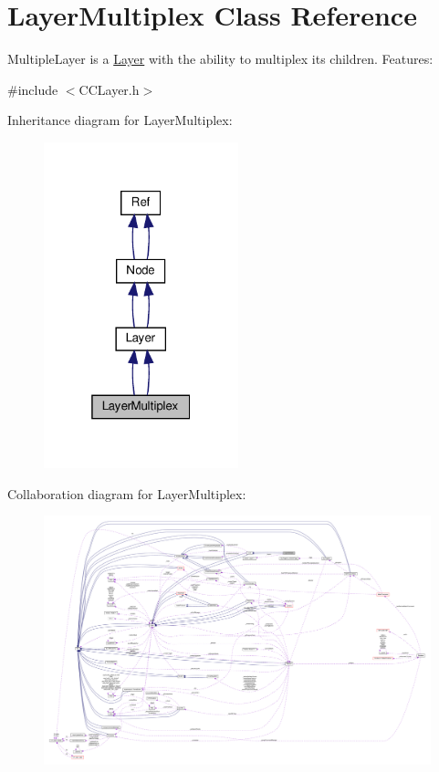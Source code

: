 \hypertarget{classLayerMultiplex}{}\section{Layer\+Multiplex Class Reference}
\label{classLayerMultiplex}


Multiple\+Layer is a \hyperlink{classLayer}{Layer} with the ability to multiplex it\textquotesingle{}s children. Features\+:  




{\ttfamily \#include $<$C\+C\+Layer.\+h$>$}



Inheritance diagram for Layer\+Multiplex\+:
\nopagebreak
\begin{figure}[H]
\begin{center}
\leavevmode
\includegraphics[width=160pt]{classLayerMultiplex__inherit__graph}
\end{center}
\end{figure}


Collaboration diagram for Layer\+Multiplex\+:
\nopagebreak
\begin{figure}[H]
\begin{center}
\leavevmode
\includegraphics[width=350pt]{classLayerMultiplex__coll__graph}
\end{center}
\end{figure}
